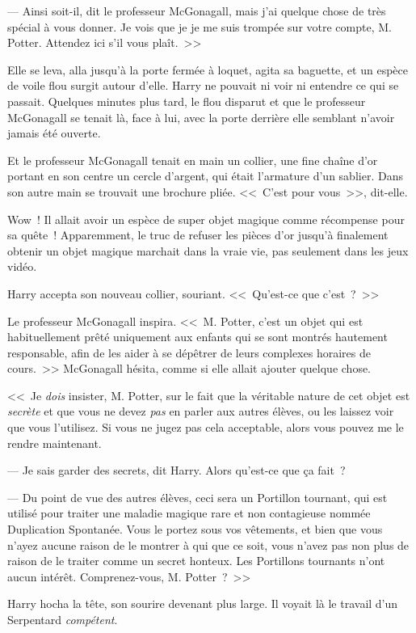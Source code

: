 --- Ainsi soit-il, dit le professeur McGonagall, mais j'ai quelque chose de très spécial à vous donner. Je vois que je je me suis trompée sur votre compte, M. Potter. Attendez ici s'il vous plaît.~>>

Elle se leva, alla jusqu'à la porte fermée à loquet, agita sa baguette, et un espèce de voile flou surgit autour d'elle. Harry ne pouvait ni voir ni entendre ce qui se passait. Quelques minutes plus tard, le flou disparut et que le professeur McGonagall se tenait là, face à lui, avec la porte derrière elle semblant n'avoir jamais été ouverte.

Et le professeur McGonagall tenait en main un collier, une fine chaîne d'or portant en son centre un cercle d'argent, qui était l'armature d'un sablier. Dans son autre main se trouvait une brochure pliée. <<~C'est pour vous~>>, dit-elle.

Wow~! Il allait avoir un espèce de super objet magique comme récompense pour sa quête~! Apparemment, le truc de refuser les pièces d'or jusqu'à finalement obtenir un objet magique marchait dans la vraie vie, pas seulement dans les jeux vidéo.

Harry accepta son nouveau collier, souriant. <<~Qu'est-ce que c'est~?~>>

Le professeur McGonagall inspira. <<~M. Potter, c'est un objet qui est habituellement prêté uniquement aux enfants qui se sont montrés hautement responsable, afin de les aider à se dépêtrer de leurs complexes horaires de cours.~>> McGonagall hésita, comme si elle allait ajouter quelque chose.

<<~Je \emph{dois} insister, M. Potter, sur le fait que la véritable nature de cet objet est \emph{secrète} et que vous ne devez \emph{pas} en parler aux autres élèves, ou les laissez voir que vous l'utilisez. Si vous ne jugez pas cela acceptable, alors vous pouvez me le rendre maintenant.

--- Je sais garder des secrets, dit Harry. Alors qu'est-ce que ça fait~?

--- Du point de vue des autres élèves, ceci sera un Portillon tournant, qui est utilisé pour traiter une maladie magique rare et non contagieuse nommée Duplication Spontanée. Vous le portez sous vos vêtements, et bien que vous n'ayez aucune raison de le montrer à qui que ce soit, vous n'avez pas non plus de raison de le traiter comme un secret honteux. Les Portillons tournants n'ont aucun intérêt. Comprenez-vous, M. Potter~?~>>

Harry hocha la tête, son sourire devenant plus large. Il voyait là le travail d'un Serpentard \emph{compétent}.

